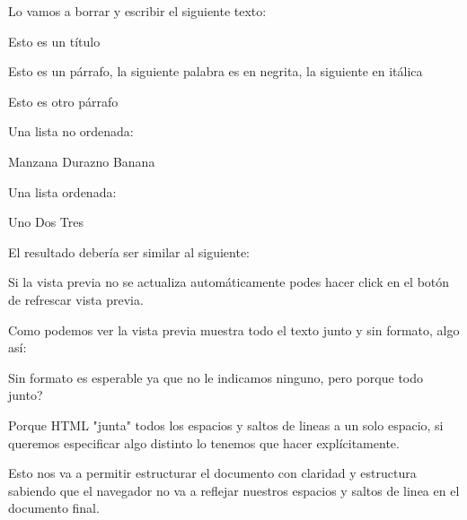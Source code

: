 \documentclass[letterpaper,10pt,spanish]{sphinxmanual}
\begin{document}
Lo vamos a borrar y escribir el siguiente texto:

%
\begin{sphinxVerbatim}[commandchars=\\\{\}]
Esto es un título

Esto es un párrafo, la siguiente palabra es en negrita, la siguiente en itálica

Esto es otro párrafo

Una lista no ordenada:

Manzana
Durazno
Banana

Una lista ordenada:

Uno
Dos
Tres
\end{sphinxVerbatim}

El resultado debería ser similar al siguiente:

\begin{figure}[htbp]
\centering

\noindent{}
\end{figure}

Si la vista previa no se actualiza automáticamente podes hacer click en el
botón de refrescar vista previa.

Como podemos ver la vista previa muestra todo el texto junto y sin formato, algo así:

%
\begin{sphinxVerbatim}[commandchars=\\\{\}]
                                  
\end{sphinxVerbatim}

Sin formato es esperable ya que no le indicamos ninguno, pero porque todo junto?

Porque HTML "junta" todos los espacios y saltos de lineas a un solo espacio, si queremos especificar algo distinto lo tenemos que hacer explícitamente.

Esto nos va a permitir estructurar el documento con claridad y estructura sabiendo
que el navegador no va a reflejar nuestros espacios y saltos de linea en el documento final.
\end{document}
